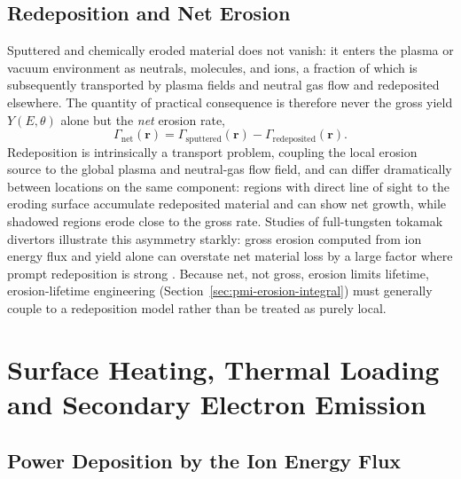 \subsection{Redeposition and Net Erosion}

Sputtered and chemically eroded material does not vanish: it enters the plasma or vacuum environment as neutrals, molecules, and ions, a fraction of which is subsequently transported by plasma fields and neutral gas flow and redeposited elsewhere. The quantity of practical consequence is therefore never the gross yield $Y(E,\theta)$ alone but the \emph{net} erosion rate,
\begin{equation}
\Gamma_{\mathrm{net}}(\mathbf{r}) = \Gamma_{\mathrm{sputtered}}(\mathbf{r}) - \Gamma_{\mathrm{redeposited}}(\mathbf{r}).
\label{eq:pmi-neterosion}
\end{equation}
Redeposition is intrinsically a transport problem, coupling the local erosion source to the global plasma and neutral-gas flow field, and can differ dramatically between locations on the same component: regions with direct line of sight to the eroding surface accumulate redeposited material and can show net growth, while shadowed regions erode close to the gross rate. Studies of full-tungsten tokamak divertors illustrate this asymmetry starkly: gross erosion computed from ion energy flux and yield alone can overstate net material loss by a large factor where prompt redeposition is strong \cite{ref0158}. Because net, not gross, erosion limits lifetime, erosion-lifetime engineering (Section~\ref{sec:pmi-erosion-integral}) must generally couple to a redeposition model rather than be treated as purely local.

\section{Surface Heating, Thermal Loading and Secondary Electron Emission}
\label{sec:pmi-heating}

\subsection{Power Deposition by the Ion Energy Flux}

